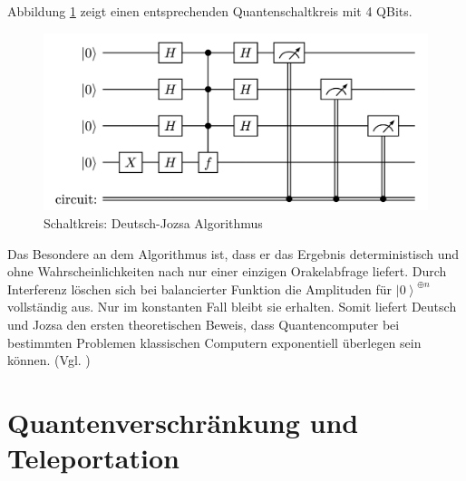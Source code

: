 Abbildung \ref{fig:deutsch-jozsa-schaltung} zeigt einen entsprechenden Quantenschaltkreis mit 4 QBits. 
\begin{figure}
    \centering
    \includegraphics[width=1\linewidth]{images//quantum-information/deutsch-jozsa schaltkreis.png}
    \caption{Schaltkreis: Deutsch-Jozsa Algorithmus}
    \label{fig:deutsch-jozsa-schaltung}
\end{figure}

Das Besondere an dem Algorithmus ist, dass er das Ergebnis deterministisch und ohne Wahrscheinlichkeiten nach nur einer einzigen Orakelabfrage liefert. Durch Interferenz löschen sich bei balancierter Funktion die Amplituden für $\left|0\right\rangle^{\oplus n}$ vollständig aus. Nur im konstanten Fall bleibt sie erhalten. Somit liefert Deutsch und Jozsa den ersten theoretischen Beweis, dass Quantencomputer bei bestimmten Problemen klassischen Computern exponentiell überlegen sein können. (Vgl. \cite[S.62-66]{homeister_quantum_2022})





\section{Quantenverschränkung und Teleportation}

